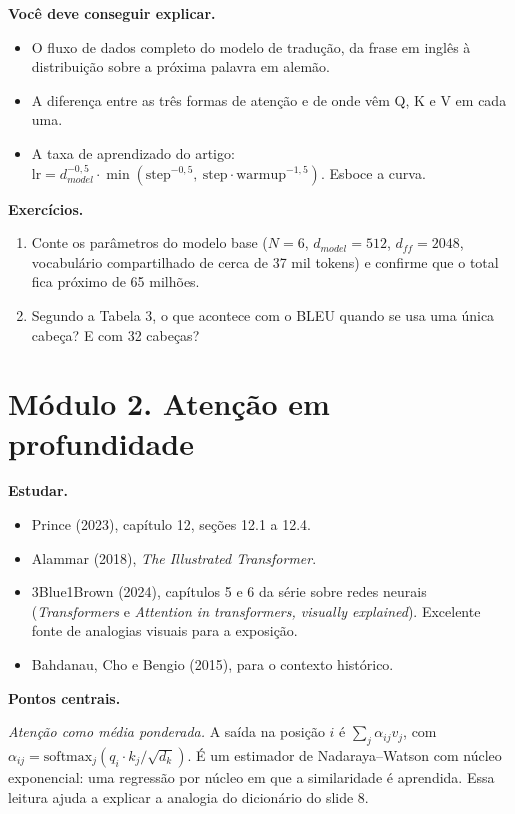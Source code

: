 \documentclass[
  11pt,
]{article}
\providecommand{\tightlist}{%
  \setlength{\itemsep}{0pt}\setlength{\parskip}{0pt}}
\begin{document}
\textbf{Você deve conseguir explicar.}

\begin{itemize}
\tightlist
\item
  O fluxo de dados completo do modelo de tradução, da frase em inglês à
  distribuição sobre a próxima palavra em alemão.
\item
  A diferença entre as três formas de atenção e de onde vêm Q, K e V em
  cada uma.
\item
  A taxa de aprendizado do artigo:
  \(\text{lr} = d_{model}^{-0,5} \cdot \min(\text{step}^{-0,5},\ \text{step} \cdot \text{warmup}^{-1,5})\).
  Esboce a curva.
\end{itemize}

\textbf{Exercícios.}

\begin{enumerate}
\def\labelenumi{\arabic{enumi}.}
\tightlist
\item
  Conte os parâmetros do modelo base (\(N = 6\), \(d_{model} = 512\),
  \(d_{ff} = 2048\), vocabulário compartilhado de cerca de 37 mil
  tokens) e confirme que o total fica próximo de 65 milhões.
\item
  Segundo a Tabela 3, o que acontece com o BLEU quando se usa uma única
  cabeça? E com 32 cabeças?
\end{enumerate}

\section{Módulo 2. Atenção em
profundidade}\label{muxf3dulo-2.-atenuxe7uxe3o-em-profundidade}

\textbf{Estudar.}

\begin{itemize}
\tightlist
\item
  Prince (2023), capítulo 12, seções 12.1 a 12.4.
\item
  Alammar (2018), \emph{The Illustrated Transformer}.
\item
  3Blue1Brown (2024), capítulos 5 e 6 da série sobre redes neurais
  (\emph{Transformers} e \emph{Attention in transformers, visually
  explained}). Excelente fonte de analogias visuais para a exposição.
\item
  Bahdanau, Cho e Bengio (2015), para o contexto histórico.
\end{itemize}

\textbf{Pontos centrais.}

\emph{Atenção como média ponderada.} A saída na posição \(i\) é
\(\sum_j \alpha_{ij} v_j\), com
\(\alpha_{ij} = \text{softmax}_j(q_i \cdot k_j / \sqrt{d_k})\). É um
estimador de Nadaraya--Watson com núcleo exponencial: uma regressão por
núcleo em que a similaridade é aprendida. Essa leitura ajuda a explicar
a analogia do dicionário do slide 8.
\end{document}

